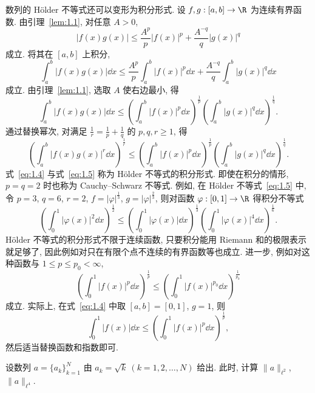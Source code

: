 数列的 Hölder 不等式还可以变形为积分形式. 设 $f, g: [a, b] \to \R$ 为连续有界函数. 由引理~\ref{lem:1.1}, 对任意 $A > 0$,
\[
|f(x)g(x)| \leq \frac{A^{p}}{p}|f(x)|^{p} + \frac{A^{-q}}{q}|g(x)|^{q}
\]
成立. 将其在 $[a, b]$ 上积分,
\[
\int_{a}^{b} |f(x)g(x)| \dd x \leq \frac{A^{p}}{p}\int_{a}^{b} |f(x)|^{p} \dd x + \frac{A^{-q}}{q}\int_{a}^{b} |g(x)|^{q} \dd x
\]
成立. 由引理~\ref{lem:1.1}, 选取 $A$ 使右边最小, 得
\begin{equation}\tag{1.4}\label{eq:1.4}
\int_{a}^{b} |f(x)g(x)| \dd x \leq \left(\int_{a}^{b} |f(x)|^{p} \dd x\right)^{\frac{1}{p}}\left(\int_{a}^{b} |g(x)|^{q} \dd x\right)^{\frac{1}{q}}.
\end{equation}
通过替换幂次, 对满足 $\frac{1}{r} = \frac{1}{p} + \frac{1}{q}$ 的 $p, q, r \geq 1$, 得
\begin{equation}\tag{1.5}\label{eq:1.5}
\left(\int_{a}^{b} |f(x)g(x)|^{r} \dd x\right)^{\frac{1}{r}} \leq \left(\int_{a}^{b} |f(x)|^{p} \dd x\right)^{\frac{1}{p}}\left(\int_{a}^{b} |g(x)|^{q} \dd x\right)^{\frac{1}{q}}.
\end{equation}
式~\eqref{eq:1.4} 与式~\eqref{eq:1.5} 称为 Hölder 不等式的积分形式. 即使在积分的情形, $p = q = 2$ 时也称为 Cauchy--Schwarz 不等式. 例如, 在 Hölder 不等式~\eqref{eq:1.5} 中, 令 $p = 3$, $q = 6$, $r = 2$, $f = |\varphi|^{\frac{1}{3}}$, $g = |\varphi|^{\frac{2}{3}}$, 则对函数 $\varphi: [0, 1] \to \R$ 得积分不等式
\begin{equation}\tag{1.6}\label{eq:1.6}
\left(\int_{0}^{1} |\varphi(x)|^{2} \dd x\right)^{\frac{1}{2}} \leq \left(\int_{0}^{1} |\varphi(x)| \dd x\right)^{\frac{1}{3}}\left(\int_{0}^{1} |\varphi(x)|^{4} \dd x\right)^{\frac{1}{6}}.
\end{equation}
Hölder 不等式的积分形式不限于连续函数, 只要积分能用 Riemann 和的极限表示就足够了, 因此例如对只在有限个点不连续的有界函数等也成立. 进一步, 例如对这种函数与 $1 \leq p \leq p_{0} < \infty$,
\begin{equation}\tag{1.7}\label{eq:1.7}
\left(\int_{0}^{1} |f(x)|^{p} \dd x\right)^{\frac{1}{p}} \leq \left(\int_{0}^{1} |f(x)|^{p_{0}} \dd x\right)^{\frac{1}{p_{0}}}
\end{equation}
成立. 实际上, 在式~\eqref{eq:1.4} 中取 $[a, b] = [0, 1]$, $g = 1$, 则
\[
\int_{0}^{1} |f(x)| \dd x \leq \left(\int_{0}^{1} |f(x)|^{p} \dd x\right)^{\frac{1}{p}},
\]
然后适当替换函数和指数即可.

\begin{exercise}\label{exer:1.1}
设数列 $a = \{a_k\}_{k=1}^{N}$ 由 $a_k = \sqrt{k} \ (k = 1, 2, \ldots, N)$ 给出. 此时, 计算 $\|a\|_{\ell^2}$, $\|a\|_{\ell^4}$.
\end{exercise}

